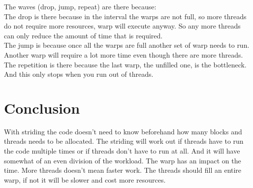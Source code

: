 \newpage

The waves (drop, jump, repeat) are there because: \\
The drop is there because in the interval the warps are not full, so more threads do not require more resources, warp will execute anyway. So any more threads can only reduce the amount of time that is required. \\
The jump is because once all the warps are full another set of warp needs to run. Another warp will require a lot more time even though there are more threads. \\
The repetition is there because the last warp, the unfilled one, is the bottleneck. And this only stops when you run out of threads.

\section{Conclusion}
\label{sec:conclusion}

With striding the code doesn't need to know beforehand how many blocks and threads needs to be allocated. The striding will work out if threads have to run the code multiple times or if threads don't have to run at all. And it will have somewhat of an even division of the workload. The warp has an impact on the time. More threads doesn't mean faster work. The threads should fill an entire warp, if not it will be slower and cost more resources.